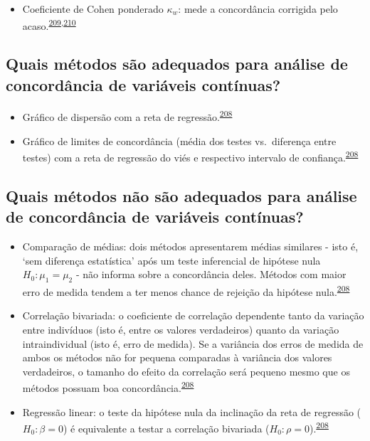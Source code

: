 \documentclass[
  a4paper,
]{book}
\providecommand{\tightlist}{%
  \setlength{\itemsep}{0pt}\setlength{\parskip}{0pt}}
\begin{document}
\begin{itemize}
\tightlist
\item
  Coeficiente de Cohen ponderado \(\kappa_{w}\): mede a concordância corrigida pelo acaso.\textsuperscript{\protect\hyperlink{ref-scott1955}{209},\protect\hyperlink{ref-cohen1960}{210}}
\end{itemize}

\hypertarget{quais-muxe9todos-suxe3o-adequados-para-anuxe1lise-de-concorduxe2ncia-de-variuxe1veis-contuxednuas}{%
\subsection{Quais métodos são adequados para análise de concordância de variáveis contínuas?}\label{quais-muxe9todos-suxe3o-adequados-para-anuxe1lise-de-concorduxe2ncia-de-variuxe1veis-contuxednuas}}

\begin{itemize}
\item
  Gráfico de dispersão com a reta de regressão.\textsuperscript{\protect\hyperlink{ref-altman1983}{208}}
\item
  Gráfico de limites de concordância (média dos testes vs.~diferença entre testes) com a reta de regressão do viés e respectivo intervalo de confiança.\textsuperscript{\protect\hyperlink{ref-altman1983}{208}}
\end{itemize}

\hypertarget{quais-muxe9todos-nuxe3o-suxe3o-adequados-para-anuxe1lise-de-concorduxe2ncia-de-variuxe1veis-contuxednuas}{%
\subsection{Quais métodos não são adequados para análise de concordância de variáveis contínuas?}\label{quais-muxe9todos-nuxe3o-suxe3o-adequados-para-anuxe1lise-de-concorduxe2ncia-de-variuxe1veis-contuxednuas}}

\begin{itemize}
\item
  Comparação de médias: dois métodos apresentarem médias similares - isto é, `sem diferença estatística' após um teste inferencial de hipótese nula \(H_{0}:\mu_{1} = \mu_{2}\) - não informa sobre a concordância deles. Métodos com maior erro de medida tendem a ter menos chance de rejeição da hipótese nula.\textsuperscript{\protect\hyperlink{ref-altman1983}{208}}
\item
  Correlação bivariada: o coeficiente de correlação dependente tanto da variação entre indivíduos (isto é, entre os valores verdadeiros) quanto da variação intraindividual (isto é, erro de medida). Se a variância dos erros de medida de ambos os métodos não for pequena comparadas à variância dos valores verdadeiros, o tamanho do efeito da correlação será pequeno mesmo que os métodos possuam boa concordância.\textsuperscript{\protect\hyperlink{ref-altman1983}{208}}
\item
  Regressão linear: o teste da hipótese nula da inclinação da reta de regressão (\(H_{0}:\beta = 0\)) é equivalente a testar a correlação bivariada (\(H_{0}:\rho = 0\)).\textsuperscript{\protect\hyperlink{ref-altman1983}{208}}
\end{itemize}
\end{document}
